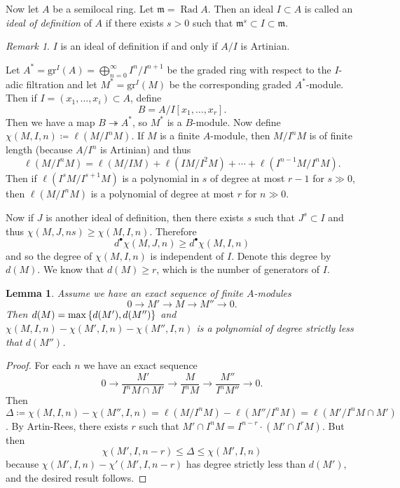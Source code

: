 \documentclass[leqno, openany]{memoir}
\newtheorem{lem}[thm]{Lemma}
\theoremstyle{definition}
\theoremstyle{remark}
\newtheorem{rmk}[thm]{Remark}
\theoremstyle{plain}
\theoremstyle{definition}
\theoremstyle{remark}
\newcommand{\mf}[1]{\mathfrak{#1}}
\newcommand{\mr}[1]{\mathrm{#1}}
\begin{document}
Now let $A$ be a semilocal ring. Let $\mf{m} = \operatorname{Rad} A$. Then an ideal $I \subset A$ is called an \textit{ideal of definition} of $A$ if there exists $s > 0$ such that $\mf{m}^s \subset I \subset \mf{m}$.

\begin{rmk}
    $I$ is an ideal of definition if and only if $A/I$ is Artinian.
\end{rmk}

Let $A^* = \mr{gr}^I(A) = \bigoplus_{n=0}^{\infty} I^n / I^{n+1}$ be the graded ring with respect to the $I$-adic filtration and let $M^* = \mr{gr}^I(M)$ be the corresponding graded $A^*$-module. Then if $I = (x_1, \ldots, x_i) \subset A$, define
\[ B = A/I[x_1, \ldots, x_r]. \]
Then we have a map $B \twoheadrightarrow A^*$, so $M^*$ is a $B$-module. Now define $\chi(M,I,n) \coloneqq \ell(M / I^nM)$. If $M$ is a finite $A$-module, then $M/I^n M$ is of finite length (because $A/I^n$ is Artinian) and thus
\[ \ell(M/I^nM) = \ell(M/IM) + \ell(IM/I^2M) + \cdots + \ell(I^{n-1}M / I^n M). \]
Then if $\ell(I^sM / I^{s+1}M)$ is a polynomial in $s$ of degree at most $r-1$ for $s \gg 0$, then $\ell(M/I^nM)$ is a polynomial of degree at most $r$ for $n \gg 0$.

Now if $J$ is another ideal of definition, then there exists $s$ such that $J^s \subset I$ and thus $\chi (M, J, ns) \geq \chi(M,I,n)$. Therefore
\[ d^{\bullet} \chi(M,J,n) \geq d^{\bullet} \chi(M,I,n) \]
and so the degree of $\chi(M,I,n)$ is independent of $I$. Denote this degree by $d(M)$. We know that $d(M) \geq r$, which is the number of generators of $I$.

\begin{lem}
    Assume we have an exact sequence of finite $A$-modules
    \[ 0 \to M' \to M \to M'' \to 0. \]
    Then $d(M) = \max \qty{ d(M'), d(M'') }$ and $\chi(M, I,n) - \chi(M', I, n) - \chi(M'', I, n)$ is a polynomial of degree strictly less that $d(M'')$.
\end{lem}

\begin{proof}
    For each $n$ we have an exact sequence
    \[ 0 \to \frac{M'}{I^n M \cap M'} \to \frac{M}{I^nM} \to \frac{M''}{I^n M''} \to 0. \]
    Then $\Delta \coloneqq \chi(M,I,n) - \chi(M'', I, n) = \ell(M/I^nM) - \ell(M'' / I^n M) = \ell(M' / I^n M \cap M')$. By Artin-Rees, there exists $r$ such that $M' \cap I^n M = I^{n-r} \cdot (M' \cap I^r M)$. But then
    \[ \chi(M',I, n-r) \leq \Delta \leq \chi(M', I, n) \]
    because $\chi(M', I,n) - \chi'(M', I, n-r)$ has degree strictly less than $d(M')$, and the desired result follows.
\end{proof}
\end{document}
